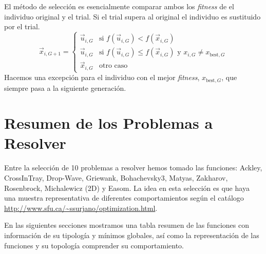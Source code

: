 \documentclass{article}
\begin{document}
El método de selección es esencialmente comparar ambos los \textit{fitness} de el individuo original y el trial. Si el trial supera al original el individuo es sustituido por el trial.
\begin{equation}
    \vec{x}_{i,G+1} = \left\{\begin{array}{cl}
            \vec{u}_{i,G}&\text{si }f(\vec{u}_{i,G})<f(\vec{x}_{i,G})\\
            \vec{u}_{i,G}&\text{si }f(\vec{u}_{i,G})\le f(\vec{x}_{i,G})\text{ y }x_{i, G}\neq x_{\text{best}, G}\\
            \vec{x}_{i,G}&\text{otro caso}
        \end{array}\right.
\label{ec_seleccion}
\end{equation}
Hacemos una excepción para el individuo con el mejor \textit{fitness}, $x_{\text{best},G}$, que siempre pasa a la siguiente generación.

\section{Resumen de los Problemas a Resolver}
Entre la selección de 10 problemas a resolver hemos tomado las funciones: Ackley, CrossInTray, Drop-Wave, Griewank, Bohachevsky3, Matyas, Zakharov, Rosenbrock, Michalewicz (2D) y Easom. La idea en esta selección es que haya una muestra representativa de diferentes comportamientos según el catálogo \url{http://www.sfu.ca/~ssurjano/optimization.html}.

En las siguientes secciones mostramos una tabla resumen de las funciones con información de su tipología y mínimos globales, así como la representación de las funciones y su topología comprender su comportamiento.
\end{document}
